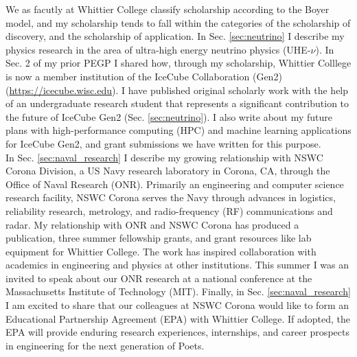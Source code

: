 \documentclass[../../main.tex]{subfiles}
\begin{document}
\label{sec:scholarship}

We as facutly at Whittier College classify scholarship according to the Boyer model, and my scholarship tends to fall within the categories of the scholarship of discovery, and the scholarship of application.  In Sec. \ref{sec:neutrino} I describe my physics research in the area of ultra-high energy neutrino physics (UHE-$\nu$).  In Sec. 2 of my prior PEGP I shared how, through my scholarship, Whittier Colllege is now a member institution of the IceCube Collaboration (Gen2) (\url{https://icecube.wisc.edu}).  I have published original scholarly work with the help of an undergraduate research student that represents a significant contribution to the future of IceCube Gen2 (Sec. \ref{sec:neutrino}).  I also write about my future plans with high-performance computing (HPC) and machine learning applications for IceCube Gen2, and grant submissions we have written for this purpose.
\\
\vspace{0.25cm}
In Sec. \ref{sec:naval_research} I describe my growing relationship with NSWC Corona Division, a US Navy research laboratory in Corona, CA, through the Office of Naval Research (ONR).  Primarily an engineering and computer science research facility, NSWC Corona serves the Navy through advances in logistics, reliability research, metrology, and radio-frequency (RF) communications and radar.  My relationship with ONR and NSWC Corona has produced a publication, three summer fellowship grants, and grant resources like lab equipment for Whittier College.  The work has inspired collaboration with academics in engineering and physics at other institutions.  This summer I was an invited to speak about our ONR research at a national conference at the Massachusetts Institute of Technology (MIT).  Finally, in Sec. \ref{sec:naval_research} I am excited to share that our colleagues at NSWC Corona would like to form an Educational Partnership Agreement (EPA) with Whittier College.  If adopted, the EPA will provide enduring research experiences, internships, and career prospects in engineering for the next generation of Poets.

\begin{flushleft}

\end{flushleft}

\begin{flushleft}

\end{flushleft}
\end{document}
